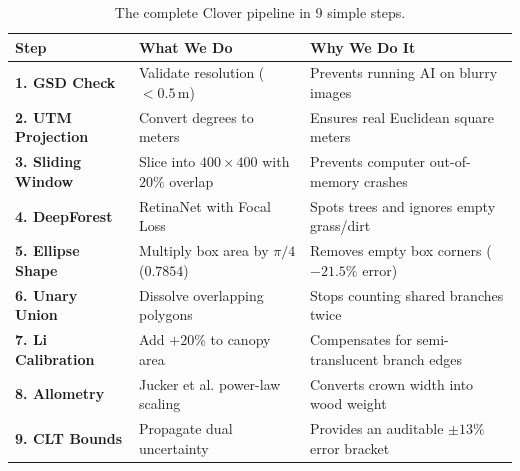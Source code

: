 \documentclass[11pt,a4paper]{article}
\begin{document}
\begin{table}[h]
\centering
\small
\begin{tabular}{@{}lll@{}}
\toprule
\textbf{Step} & \textbf{What We Do} & \textbf{Why We Do It} \\ \midrule
\textbf{1. GSD Check} & Validate resolution ($< 0.5\,\text{m}$) & Prevents running AI on blurry images \\
\textbf{2. UTM Projection} & Convert degrees to meters & Ensures real Euclidean square meters \\
\textbf{3. Sliding Window} & Slice into $400 \times 400$ with $20\%$ overlap & Prevents computer out-of-memory crashes \\
\textbf{4. DeepForest} & RetinaNet with Focal Loss & Spots trees and ignores empty grass/dirt \\
\textbf{5. Ellipse Shape} & Multiply box area by $\pi/4$ ($0.7854$) & Removes empty box corners ($-21.5\%$ error) \\
\textbf{6. Unary Union} & Dissolve overlapping polygons & Stops counting shared branches twice \\
\textbf{7. Li Calibration} & Add $+20\%$ to canopy area & Compensates for semi-translucent branch edges \\
\textbf{8. Allometry} & Jucker et al. power-law scaling & Converts crown width into wood weight \\
\textbf{9. CLT Bounds} & Propagate dual uncertainty & Provides an auditable $\pm 13\%$ error bracket \\ \bottomrule
\end{tabular}
\caption{The complete Clover pipeline in 9 simple steps.}
\end{table}
\end{document}
